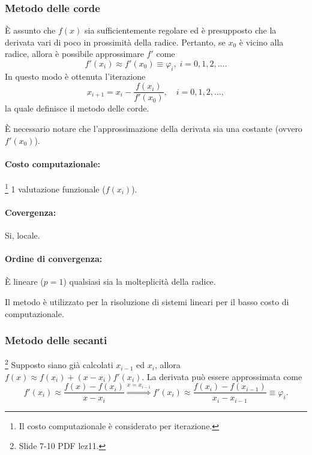 \subsubsection{Metodo delle corde}
È assunto che $f(x)$ sia sufficientemente regolare ed è presupposto che la derivata vari di poco in prossimità della radice.
Pertanto, se $x_0$ è vicino alla radice, allora è possibile approssimare $f'$ come
\begin{equation*}
	f'(x_i)\approx f'(x_0)\equiv\varphi_i,\; i=0,1,2,\hdots.
\end{equation*}
In questo modo è ottenuta l'iterazione 
\begin{equation}\label{eq:approxCorde}
	x_{i+1}=x_i-\frac{f(x_i)}{f'(x_0)}, \quad i=0,1,2,\hdots,
\end{equation}
la quale definisce il metodo delle corde.

È necessario notare che l'approssimazione della derivata sia una costante (ovvero $f'(x_0)$).

\paragraph{Costo computazionale:}\footnote{Il costo computazionale è considerato per iterazione.} 1 valutazione funzionale ($f(x_i)$).
\paragraph{Covergenza:}Si, locale.
\paragraph{Ordine di convergenza:} È lineare ($p = 1$) qualsiasi sia la molteplicità della radice.

Il metodo è utilizzato per la risoluzione di sistemi lineari per il basso costo di computazionale.

\subsubsection{Metodo delle secanti}
\footnote{Slide 7-10 PDF lez11.}
Supposto siano già calcolati $x_{i-1}$ ed $x_i$, allora $f(x)\approx f(x_i)+(x-x_i)f'(x_i)$. La derivata può essere approssimata come 
\begin{equation*}
	f'(x_i)\approx\frac{f(x)-f(x_{i})}{x-x_i}\overset{x=x_{i-1}}{\Longrightarrow}f'(x_i)\approx\frac{f(x_i)-f(x_{i-1})}{x_i-x_{i-1}}\equiv\varphi_i.
\end{equation*}

